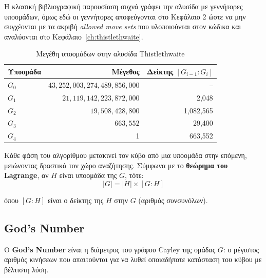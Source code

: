 Η κλασική βιβλιογραφική παρουσίαση συχνά γράφει την αλυσίδα με
γεννήτορες υποομάδων, όμως εδώ οι γεννήτορες αποφεύγονται στο Κεφάλαιο 2
ώστε να μην συγχέονται με τα ακριβή \emph{allowed move sets} που υλοποιούνται
στον κώδικα και αναλύονται στο Κεφάλαιο~\ref{ch:thistlethwaite}.

\begin{table}[h]
\centering
\caption{Μεγέθη υποομάδων στην αλυσίδα Thistlethwaite}
\label{tab:subgroup_sizes}
\begin{tabular}{lrr}
\toprule
\textbf{Υποομάδα} & \textbf{Μέγεθος} & \textbf{Δείκτης} $[G_{i-1}:G_i]$ \\
\midrule
$G_0$ & $43{,}252{,}003{,}274{,}489{,}856{,}000$ & -- \\
$G_1$ & $21{,}119{,}142{,}223{,}872{,}000$ & 2,048 \\
$G_2$ & $19{,}508{,}428{,}800$ & 1,082,565 \\
$G_3$ & $663{,}552$ & 29,400 \\
$G_4$ & 1 & 663,552 \\
\bottomrule
\end{tabular}
\end{table}

Κάθε φάση του αλγορίθμου μετακινεί τον κύβο από μια υποομάδα στην επόμενη, μειώνοντας δραστικά τον χώρο αναζήτησης. Σύμφωνα με το \textbf{θεώρημα του Lagrange}, αν $H$ είναι υποομάδα της $G$, τότε:
\begin{equation}
    |G| = |H| \times [G:H]
\end{equation}

όπου $[G:H]$ είναι ο δείκτης της $H$ στην $G$ (αριθμός συνσυνόλων).

\subsection{God's Number}
\label{subsec:gods_number}

Ο \textbf{God's Number} είναι η διάμετρος του γράφου Cayley της ομάδας $G$: ο μέγιστος αριθμός κινήσεων που απαιτούνται για να λυθεί οποιαδήποτε κατάσταση του κύβου με βέλτιστη λύση.

